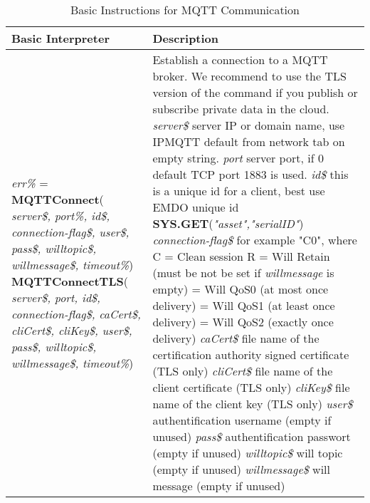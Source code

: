 \begin{table}[h!]
\centering
\caption{Basic Instructions for MQTT Communication}
\label{Basic_Instructions_for_MQTT_Communication}
\begin{tabular}{|p{4cm}|p{10cm}|}
\hline
\textbf{Basic Interpreter} & \textbf{Description}
\\ \hline
\textit{err\%} = \textbf{MQTTConnect}( \textit{server\$, port\%, id\$, connection-flag\$, user\$, pass\$, willtopic\$, willmessage\$, timeout\%})\newline
\textbf{MQTTConnectTLS}( \textit{server\$, port, id\$, connection-flag\$, caCert\$, cliCert\$, cliKey\$, user\$, pass\$, willtopic\$, willmessage\$, timeout\%})
&
Establish a connection to a MQTT broker. We recommend to use the TLS version of the command if you publish or subscribe private data in the cloud.\newline
\textit{server\$} server IP or domain name, use IPMQTT default from network tab on empty string.\newline
\textit{port} server port, if 0 default TCP port 1883 is used.\newline 
\textit{id\$} this is a unique id for a client, best use EMDO unique id \textbf{SYS.GET}(\textit{"asset","serialID"})\newline
\textit{connection-flag\$} for example "C0", where\newline
    C = Clean session\newline
	R = Will Retain (must be not be set if \textit{willmessage} is empty)\newline
	0 = Will QoS0 (at most once delivery)\newline
	1 = Will QoS1 (at least once delivery)\newline
 	2 = Will QoS2 (exactly once delivery)\newline
\textit{caCert\$} file name of the certification authority signed certificate (TLS only)\newline 
\textit{cliCert\$} file name of the client certificate (TLS only)\newline 
\textit{cliKey\$} file name of the client key (TLS only)\newline 
\textit{user\$} authentification username (empty if unused)\newline 
\textit{pass\$} authentification passwort (empty if unused)\newline 
\textit{willtopic\$} will topic (empty if unused)\newline  
\textit{willmessage\$} will message (empty if unused)\newline 

\end{tabular}
\end{table}
